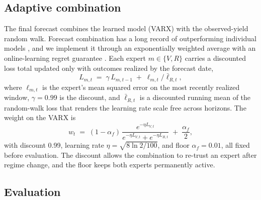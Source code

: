\documentclass[10pt]{article}
\begin{document}
\subsection{Adaptive combination}

The final forecast combines the learned model (VARX) with the observed-yield random walk. Forecast combination has a long record of outperforming individual models \cite{batesgranger1969, timmermann2006}, and we implement it through an exponentially weighted average with an online-learning regret guarantee \cite{cesabianchi2006}. Each expert $m \in \{V, R\}$ carries a discounted loss total updated only with outcomes realized by the forecast date,
\begin{equation}
L_{m,t} \;=\; \gamma\, L_{m,t-1} \;+\; \ell_{m,t} / \bar{\ell}_{R,t},
\label{eq:ewaloss}
\end{equation}
where $\ell_{m,t}$ is the expert's mean squared error on the most recently realized window, $\gamma = 0.99$ is the discount, and $\bar{\ell}_{R,t}$ is a discounted running mean of the random-walk loss that renders the learning rate scale free across horizons. The weight on the VARX is
\begin{equation}
w_t \;=\; (1-\alpha_f)\,\frac{e^{-\eta L_{V,t}}}{e^{-\eta L_{V,t}} + e^{-\eta L_{R,t}}} \;+\; \frac{\alpha_f}{2},
\label{eq:ewa}
\end{equation}
with discount 0.99, learning rate $\eta = \sqrt{8 \ln 2 / 100}$, and floor $\alpha_f = 0.01$, all fixed before evaluation. The discount allows the combination to re-trust an expert after regime change, and the floor keeps both experts permanently active.

\subsection{Evaluation}
\end{document}
